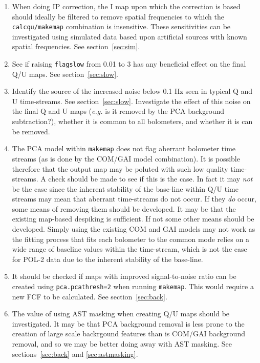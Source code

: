 \documentclass[twoside,11pt]{starlink}
\begin{document}
\begin{enumerate}
\item When doing IP correction, the I map upon which the correction is
based should ideally be filtered to remove spatial frequencies to which
the \texttt{calcqu/makemap} combination is insensitive. These
sensitivities can be investigated using simulated data based upon
artificial sources with known spatial frequencies. See
section~\ref{sec:sim}.

\item See if raising \texttt{flagslow} from 0.01 to 3 has any beneficial
effect on the final Q/U maps. See section~\ref{sec:slow}.

\item Identify the source of the increased noise below 0.1 Hz seen in
typical Q and U time-streams. See section~\ref{sec:slow}. Investigate the
effect of this noise on the final Q and U maps (\emph{e.g.} is it removed
by the PCA background subtraction?), whether it is common to
all bolometers, and whether it is can be removed.

\item The PCA model within \texttt{makemap} does not flag aberrant bolometer
time streams (as is done by the COM/GAI model combination). It is
possible therefore that the output map may be poluted with such low quality
time-streams. A check should be made to see if this is the case. In fact
it may \emph{not} be the case since the inherent stability of the
base-line within Q/U time streams may mean that aberrant time-streams do
not occur.  If they \emph{do} occur, some means of removing them should be
developed. It may be that the existing map-based despiking is sufficient.
If not some other means should be developed. Simply using the existing
COM and GAI models may not work as the fitting process that fits each
bolometer to the common mode relies on a wide range of baseline values
within the time-stream, which is not the case for POL-2 data due to the
inherent stability of the base-line.

\item It should be checked if maps with improved signal-to-noise ratio
can be created using \texttt{pca.pcathresh=2} when running
\texttt{makemap}. This would require a new FCF to be calculated. See
section~\ref{sec:back}.

\item The value of using AST masking when creating Q/U maps should be
investigated. It may be that PCA background removal is less prone to
the creation of large scale backrgound features than is COM/GAI
background removal, and so we may be better doing away with AST masking.
See sections~\ref{sec:back} and \ref{sec:astmasking}.


\end{enumerate}
\end{document}
